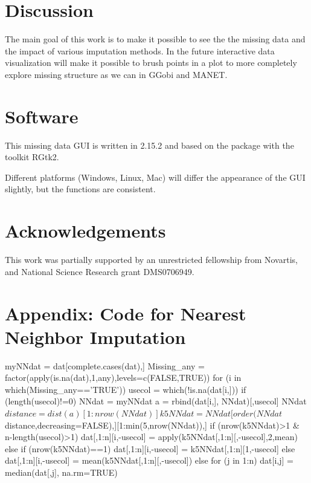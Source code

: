 \documentclass[article]{jss}
\begin{document}
\section{Discussion}

The main goal of this work is to make it possible to see the the missing data and the impact of various imputation methods. In the future interactive data visualization will make it possible to brush points in a plot to more completely explore missing structure as we can in GGobi and MANET.


\section*{Software}

This missing data GUI is written in  2.15.2 \citep{r} and based on the package  \citep{gwidgets} with the toolkit RGtk2. 

Different platforms (Windows, Linux, Mac) will differ the appearance of the GUI slightly, but the functions are consistent.

\section*{Acknowledgements}

This work was partially supported by an unrestricted fellowship from Novartis, and National Science Research grant DMS0706949.




\section*{Appendix: Code for Nearest Neighbor Imputation}

\begin{Code}
myNNdat = dat[complete.cases(dat),]
Missing_any = factor(apply(is.na(dat),1,any),levels=c(FALSE,TRUE))
for (i in which(Missing_any=='TRUE')){
    usecol = which(!is.na(dat[i,]))
    if (length(usecol)!=0){
        NNdat = myNNdat
        a = rbind(dat[i,], NNdat)[,usecol]
        NNdat$distance = dist(a)[1:nrow(NNdat)]
        k5NNdat = NNdat[order(NNdat$distance,decreasing=FALSE),][1:min(5,nrow(NNdat)),]
        if (nrow(k5NNdat)>1 & n-length(usecol)>1) {
            dat[,1:n][i,-usecol] = apply(k5NNdat[,1:n][,-usecol],2,mean)
        } else {
            if (nrow(k5NNdat)==1) {
                dat[,1:n][i,-usecol] = k5NNdat[,1:n][1,-usecol]
            } else {
                dat[,1:n][i,-usecol] = mean(k5NNdat[,1:n][,-usecol])
            }
        }
    } else {
        for (j in 1:n) {
            dat[i,j] = median(dat[,j], na.rm=TRUE)
        }
    }
}
\end{Code}
\end{document}
